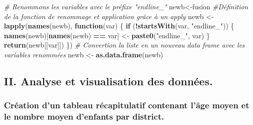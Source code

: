 \documentclass[
]{article}
\newenvironment{Shaded}{\begin{snugshade}}{\end{snugshade}}
\newcommand{\CommentTok}[1]{\textcolor[rgb]{0.56,0.35,0.01}{\textit{#1}}}
\newcommand{\ControlFlowTok}[1]{\textcolor[rgb]{0.13,0.29,0.53}{\textbf{#1}}}
\newcommand{\FunctionTok}[1]{\textcolor[rgb]{0.13,0.29,0.53}{\textbf{#1}}}
\newcommand{\NormalTok}[1]{#1}
\newcommand{\OtherTok}[1]{\textcolor[rgb]{0.56,0.35,0.01}{#1}}
\newcommand{\SpecialCharTok}[1]{\textcolor[rgb]{0.81,0.36,0.00}{\textbf{#1}}}
\newcommand{\StringTok}[1]{\textcolor[rgb]{0.31,0.60,0.02}{#1}}
\begin{document}
\begin{Shaded}
\begin{Highlighting}[]
\CommentTok{\# Renommons les variables avec le préfixe "endline\_"}
\NormalTok{newb}\OtherTok{\textless{}{-}}\NormalTok{fusion}
\CommentTok{\#Définition de la fonction de renommage et application grâce à un apply}
\NormalTok{newb }\OtherTok{\textless{}{-}} \FunctionTok{lapply}\NormalTok{(}\FunctionTok{names}\NormalTok{(newb), }\ControlFlowTok{function}\NormalTok{(var) \{}
  \ControlFlowTok{if}\NormalTok{ (}\SpecialCharTok{!}\FunctionTok{startsWith}\NormalTok{(var, }\StringTok{"endline\_"}\NormalTok{)) \{}
    \FunctionTok{names}\NormalTok{(newb)[}\FunctionTok{names}\NormalTok{(newb) }\SpecialCharTok{==}\NormalTok{ var] }\OtherTok{\textless{}{-}} \FunctionTok{paste0}\NormalTok{(}\StringTok{"endline\_"}\NormalTok{, var)}
\NormalTok{  \}}
  \FunctionTok{return}\NormalTok{(newb[[var]])}
\NormalTok{\})}
\CommentTok{\# Convertion la liste en un nouveau data frame avec les variables renommées}
\NormalTok{newb }\OtherTok{\textless{}{-}} \FunctionTok{as.data.frame}\NormalTok{(newb)}
\end{Highlighting}
\end{Shaded}

\hypertarget{ii.-analyse-et-visualisation-des-donnuxe9es.}{%
\subsection{II. Analyse et visualisation des
données.}\label{ii.-analyse-et-visualisation-des-donnuxe9es.}}

\hypertarget{cruxe9ation-dun-tableau-ruxe9capitulatif-contenant-luxe2ge-moyen-et-le-nombre-moyen-denfants-par-district.}{%
\subsubsection{Création d'un tableau récapitulatif contenant l'âge moyen
et le nombre moyen d'enfants par
district.}\label{cruxe9ation-dun-tableau-ruxe9capitulatif-contenant-luxe2ge-moyen-et-le-nombre-moyen-denfants-par-district.}}
\end{document}
